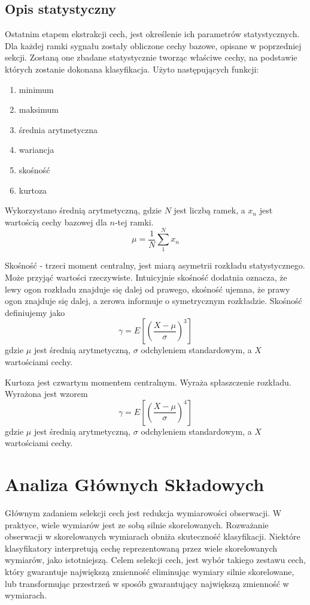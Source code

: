 \documentclass[a4paper,12pt,twoside,openany]{report}
\begin{document}
\subsection{Opis statystyczny}
Ostatnim etapem ekstrakcji cech, jest określenie ich parametrów statystycznych.
Dla każdej ramki sygnału zostały obliczone cechy bazowe, opisane w poprzedniej sekcji.
Zostaną one zbadane statystycznie tworząc właściwe cechy, na podstawie których zostanie dokonana klasyfikacja.
Użyto następujących funkcji:
\begin{enumerate}
	\item minimum 
	\item maksimum 
	\item średnia arytmetyczna
	\item wariancja 
	\item skośność
	\item kurtoza
\end{enumerate}
Wykorzystano średnią arytmetyczną, gdzie $N$ jest liczbą ramek, a $x_n$ jest wartością cechy bazowej dla $n$-tej ramki.
\begin{equation}
	\mu = \frac{1}{N}\sum_1^Nx_n
\end{equation}

Skośność - trzeci moment centralny, jest miarą asymetrii rozkładu statystycznego. 
Może przyjąć wartości rzeczywiste.
Intuicyjnie skośność dodatnia oznacza, że lewy ogon rozkładu znajduje się dalej od prawego,
skośność ujemna, że prawy ogon znajduje się dalej,
a zerowa informuje o symetrycznym rozkładzie.
Skośność definiujemy jako
\begin{equation}
	\gamma = E \left [ \left (  \frac{X - \mu}{ \sigma }   \right )^3 \right ]
\end{equation}
gdzie $\mu$ jest średnią arytmetyczną, $\sigma$ odchyleniem standardowym, a $X$ wartościami cechy.

Kurtoza jest czwartym momentem centralnym.
Wyraża spłaszczenie rozkładu. 
Wyrażona jest wzorem
\begin{equation}
	\gamma = E \left [ \left (  \frac{X - \mu}{ \sigma }   \right )^4 \right ]
\end{equation}
gdzie $\mu$ jest średnią arytmetyczną, $\sigma$ odchyleniem standardowym, a $X$ wartościami cechy.
\section{Analiza Głównych Składowych}
Głównym zadaniem selekcji cech jest redukcja wymiarowości obserwacji.
W praktyce, wiele wymiarów jest ze sobą silnie skorelowanych.
Rozważanie obserwacji w skorelowanych wymiarach obniża skuteczność klasyfikacji.
Niektóre klasyfikatory interpretują cechę reprezentowaną przez wiele skorelowanych wymiarów, jako istotniejszą.
Celem selekcji cech, jest wybór takiego zestawu cech, który gwarantuje największą zmienność eliminując wymiary silnie skorelowane, 
lub transformując przestrzeń w sposób gwarantujący największą zmienność w wymiarach.
\end{document}
